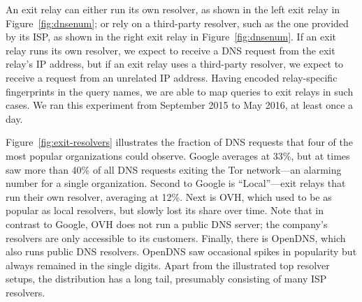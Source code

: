 An exit relay can either run its own resolver, as shown in the left exit relay in
Figure~\ref{fig:dnsenum}; or rely on a third-party resolver, such as the one
provided by its ISP, as shown in the right exit relay in Figure~\ref{fig:dnsenum}.  If
an exit relay runs its own resolver, we expect to receive a DNS request from
the exit relay's IP address, but if an exit relay uses a third-party resolver,
we expect to receive a request from an unrelated IP address.  Having encoded
relay-specific fingerprints in the query names, we are able to map queries to
exit relays in such cases.  We ran this experiment from September 2015 to May
2016, at least once a day.

Figure~\ref{fig:exit-resolvers} illustrates the fraction of DNS requests that
four of the most popular organizations could observe.  Google averages at 33\%,
but at times saw more than 40\% of all DNS requests exiting the Tor network---an
alarming number for a single organization.  Second to Google is ``Local''---exit
relays that run their own resolver, averaging at 12\%.  Next is OVH, which used
to be as popular as local resolvers, but slowly lost its share over time.  Note
that in contrast to Google, OVH does not run a public DNS server; the company's
resolvers are only accessible to its customers.  Finally, there is OpenDNS,
which also runs public DNS resolvers.  OpenDNS saw occasional spikes in
popularity but always remained in the single digits.  Apart from the illustrated
top resolver setups, the distribution has a long tail, presumably consisting of
many ISP resolvers.

